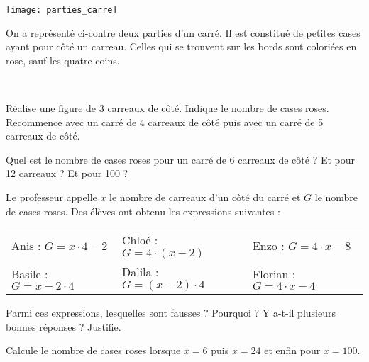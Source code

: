 \begin{activite}

\begin{minipage}[c]{0.28\linewidth}
 \texttt{[image: parties\_carre]}
 \end{minipage} \hfill
 \begin{minipage}[c]{0.68\linewidth}
On a représenté ci-contre deux parties d'un carré. Il est constitué de petites cases ayant pour côté un carreau. Celles qui se trouvent sur les bords sont coloriées en rose, sauf les quatre coins.
  \end{minipage} \\

\begin{partie}
Réalise une figure de 3 carreaux de côté. Indique le nombre de cases roses. Recommence avec un carré de 4 carreaux de côté puis avec un carré de 5 carreaux de côté.
\end{partie}

\begin{partie}
Quel est le nombre de cases roses pour un carré de 6 carreaux de côté ? Et pour 12 carreaux ? Et pour 100 ?
\end{partie}

\begin{partie}
Le professeur appelle $x$ le nombre de carreaux d'un côté du carré et $G$ le nombre de cases roses. Des élèves ont obtenu les expressions suivantes : \\[0.4em]
\begin{center}
 \begin{tabularx}{0.9\linewidth}{X|X|X}
  Anis : $G = x \cdot 4 - 2$ & Chloé : $G = 4 \cdot (x - 2)$ & Enzo : $G = 4 \cdot x - 8$ \\
  Basile : $G = x - 2 \cdot 4$ & Dalila : $G = (x - 2) \cdot 4$ & Florian : $G = 4 \cdot x - 4$ \\
  \end{tabularx}   
 \end{center}
 \vspace{0.3cm}
Parmi ces expressions, lesquelles sont fausses ? Pourquoi ? Y a-t-il plusieurs bonnes réponses ? Justifie.
\end{partie}

\begin{partie}
Calcule le nombre de cases roses lorsque $x = 6$ puis $x = 24$ et enfin pour $x = 100$.
\end{partie}

\end{activite}

